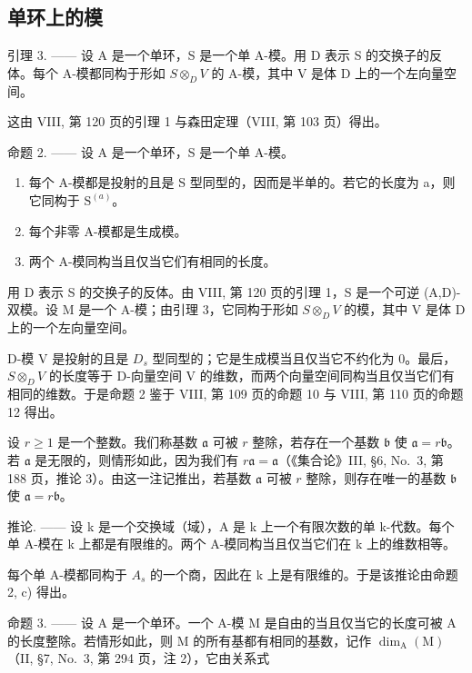 \subsection{单环上的模}

引理 3. —— 设 A 是一个单环，S 是一个单 A-模。用 D 表示 S 的交换子的反体。每个 A-模都同构于形如 \(S \otimes_{D} V\) 的 A-模，其中 V 是体 D 上的一个左向量空间。

这由 VIII, 第 120 页的引理 1 与森田定理（VIII, 第 103 页）得出。

命题 2. —— 设 A 是一个单环，S 是一个单 A-模。

\begin{enumerate}
\def\labelenumi{\alph{enumi})}
\item
  每个 A-模都是投射的且是 S 型同型的，因而是半单的。若它的长度为 a，则它同构于 \(\mathrm{S}^{(a)}\)。
\item
  每个非零 A-模都是生成模。
\item
  两个 A-模同构当且仅当它们有相同的长度。
\end{enumerate}

用 D 表示 S 的交换子的反体。由 VIII, 第 120 页的引理 1，S 是一个可逆 (A,D)-双模。设 M 是一个 A-模；由引理 3，它同构于形如 \(S \otimes_{D} V\) 的模，其中 V 是体 D 上的一个左向量空间。

D-模 V 是投射的且是 \(D_{s}\) 型同型的；它是生成模当且仅当它不约化为 0。最后，\(S \otimes_{D} V\) 的长度等于 D-向量空间 V 的维数，而两个向量空间同构当且仅当它们有相同的维数。于是命题 2 鉴于 VIII, 第 109 页的命题 10 与 VIII, 第 110 页的命题 12 得出。

设 \(r \geqslant 1\) 是一个整数。我们称基数 \(\mathfrak{a}\) 可被 \(r\) 整除，若存在一个基数 \(\mathfrak{b}\) 使 \(\mathfrak{a} = r\mathfrak{b}\)。若 \(\mathfrak{a}\) 是无限的，则情形如此，因为我们有 \(r\mathfrak{a} = \mathfrak{a}\)（《集合论》III, §6, No.~3, 第 188 页，推论 3）。由这一注记推出，若基数 \(\mathfrak{a}\) 可被 \(r\) 整除，则存在唯一的基数 \(\mathfrak{b}\) 使 \(\mathfrak{a} = r\mathfrak{b}\)。

推论. —— 设 k 是一个交换域（域），A 是 k 上一个有限次数的单 k-代数。每个单 A-模在 k 上都是有限维的。两个 A-模同构当且仅当它们在 k 上的维数相等。

每个单 A-模都同构于 \(A_{s}\) 的一个商，因此在 k 上是有限维的。于是该推论由命题 2, c) 得出。

命题 3. —— 设 A 是一个单环。一个 A-模 M 是自由的当且仅当它的长度可被 A 的长度整除。若情形如此，则 M 的所有基都有相同的基数，记作 \(\dim_{\mathrm{A}}(\mathrm{M})\)（II, §7, No.~3, 第 294 页，注 2），它由关系式

